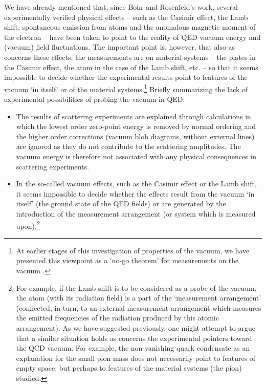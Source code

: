 \documentclass[12pt]{article}
\begin{document}
We have already mentioned that, since Bohr and Rosenfeld's work,
several experimentally verified physical effects -- such as the
Casimir effect, the Lamb shift, spontaneous emission from atoms
and the anomalous magnetic moment of the electron -- have been
taken to point to the reality of QED vacuum energy and (vacuum)
field fluctuations. The important point is, however, that also as
concerns these effects, the measurements are on material systems
-- the plates in the Casimir effect, the atom in the case of the
Lamb shift, etc. -- so that it seems impossible to decide whether
the experimental results point to features of the vacuum `in
itself' or of the material systems.\footnote{At earlier stages of
this investigation of properties of the vacuum, we have presented
this viewpoint as a `no-go theorem' for measurements on the vacuum
\cite{rugh96}.} Briefly summarizing the lack of experimental
possibilities of probing the vacuum in QED:

\begin{itemize}

\item 
The results of scattering experiments are explained through
calculations in which the lowest order zero-point energy is
removed by normal ordering and the higher order corrections
(vacuum blob diagrams, without external lines) are ignored as they
do not contribute to the scattering amplitudes. The vacuum energy
is therefore not associated with any physical consequences in
scattering experiments.


\item In the so-called vacuum effects, such as the Casimir effect
or the Lamb shift, it seems impossible to decide whether the
effects result from the vacuum `in itself' (the ground state of
the QED fields) or are generated by the introduction of the
measurement arrangement (or system which is measured
upon).\footnote{For example, if the Lamb shift is to be considered
as a probe of the vacuum, the atom (with its radiation field) is a
part of the `measurement arrangement' (connected, in turn, to an
external measurement arrangement which measures the emitted
frequencies of the radiation produced by this atomic arrangement).
As we have suggested previously, one might attempt to argue that a
similar situation holds as concerns the experimental pointers
toward the QCD vacuum. For example, the non-vanishing quark
condensate as an explanation for the small pion mass does not
necessarily point to features of empty space, but perhaps to
features of the material systems (the pion) studied.}

\end{itemize} 
\end{document}
